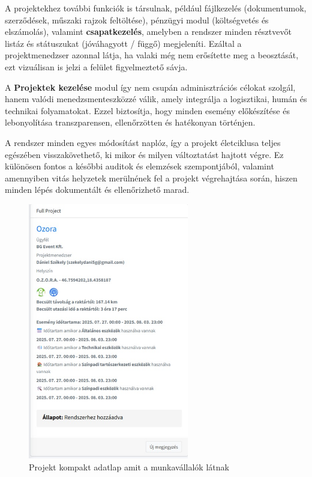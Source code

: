 A projektekhez további funkciók is társulnak, például fájlkezelés (dokumentumok, szerződések, műszaki rajzok feltöltése), pénzügyi modul (költségvetés és elszámolás), 
valamint \textbf{csapatkezelés}, amelyben a rendszer minden résztvevőt listáz és státuszukat (jóváhagyott / függő) megjeleníti.  
Ezáltal a projektmenedzser azonnal látja, ha valaki még nem erősítette meg a beosztását, ezt vizuálisan is jelzi a felület figyelmeztető sávja.

A \textbf{Projektek kezelése} modul így nem csupán adminisztrációs célokat szolgál, hanem valódi menedzsmenteszközzé válik, 
amely integrálja a logisztikai, humán és technikai folyamatokat.  
Ezzel biztosítja, hogy minden esemény előkészítése és lebonyolítása transzparensen, ellenőrzötten és hatékonyan történjen.

A rendszer minden egyes módosítást naplóz, így a projekt életciklusa teljes egészében visszakövethető, ki mikor és milyen változtatást hajtott végre.  
Ez különösen fontos a későbbi auditok és elemzések szempontjából, valamint amennyiben vitás helyzetek merülnének fel a projekt végrehajtása során,
hiszen minden lépés dokumentált és ellenőrizhető marad.
\begin{figure}[H]
    \centering
    \includegraphics[width=70mm, keepaspectratio]{figures/project_card.jpg}
    \caption{Projekt kompakt adatlap amit a munkavállalók látnak}
    \label{fig:project_card}
\end{figure}

